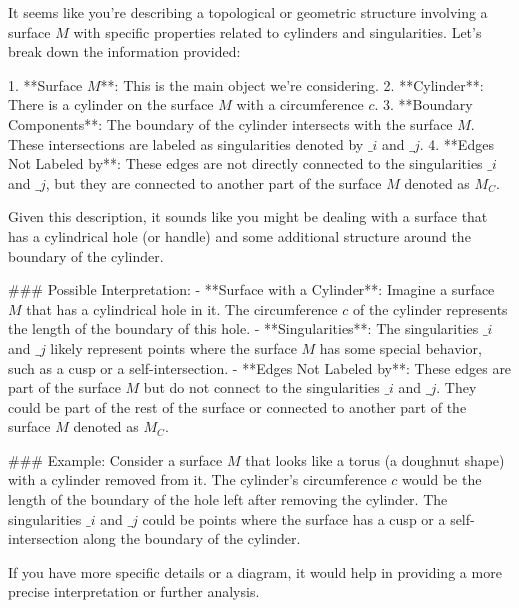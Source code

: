 It seems like you're describing a topological or geometric structure involving a surface \( M \) with specific properties related to cylinders and singularities. Let's break down the information provided:

1. **Surface \( M \)**: This is the main object we're considering.
2. **Cylinder**: There is a cylinder on the surface \( M \) with a circumference \( c \).
3. **Boundary Components**: The boundary of the cylinder intersects with the surface \( M \). These intersections are labeled as singularities denoted by \( \_i \) and \( \_j \).
4. **Edges Not Labeled by**: These edges are not directly connected to the singularities \( \_i \) and \( \_j \), but they are connected to another part of the surface \( M \) denoted as \( M_C \).

Given this description, it sounds like you might be dealing with a surface that has a cylindrical hole (or handle) and some additional structure around the boundary of the cylinder.

### Possible Interpretation:
- **Surface with a Cylinder**: Imagine a surface \( M \) that has a cylindrical hole in it. The circumference \( c \) of the cylinder represents the length of the boundary of this hole.
- **Singularities**: The singularities \( \_i \) and \( \_j \) likely represent points where the surface \( M \) has some special behavior, such as a cusp or a self-intersection.
- **Edges Not Labeled by**: These edges are part of the surface \( M \) but do not connect to the singularities \( \_i \) and \( \_j \). They could be part of the rest of the surface or connected to another part of the surface \( M \) denoted as \( M_C \).

### Example:
Consider a surface \( M \) that looks like a torus (a doughnut shape) with a cylinder removed from it. The cylinder's circumference \( c \) would be the length of the boundary of the hole left after removing the cylinder. The singularities \( \_i \) and \( \_j \) could be points where the surface has a cusp or a self-intersection along the boundary of the cylinder.

If you have more specific details or a diagram, it would help in providing a more precise interpretation or further analysis.